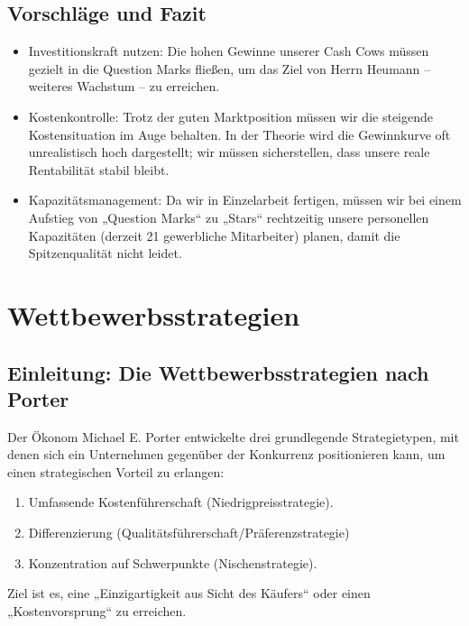 \documentclass[12pt, a4paper]{article}
\begin{document}
\subsection{Vorschläge und Fazit}
\begin{itemize}
\item Investitionskraft nutzen: Die hohen Gewinne unserer Cash Cows müssen gezielt in die Question Marks fließen, 
    um das Ziel von Herrn Heumann – weiteres Wachstum – zu erreichen.
\item Kostenkontrolle: Trotz der guten Marktposition müssen wir die steigende Kostensituation im 
    Auge behalten. In der Theorie wird die Gewinnkurve oft unrealistisch hoch dargestellt; wir müssen sicherstellen, dass unsere reale Rentabilität stabil bleibt.
\item Kapazitätsmanagement: Da wir in Einzelarbeit fertigen, müssen wir bei einem Aufstieg von 
    „Question Marks“ zu „Stars“ rechtzeitig unsere personellen Kapazitäten (derzeit 21 gewerbliche Mitarbeiter) planen, damit die Spitzenqualität nicht leidet.
\end{itemize}
\newpage

\section{Wettbewerbsstrategien}
\subsection{Einleitung: Die Wettbewerbsstrategien nach Porter}
Der Ökonom Michael E. Porter entwickelte drei grundlegende Strategietypen, 
mit denen sich ein Unternehmen gegenüber der Konkurrenz positionieren kann, 
um einen strategischen Vorteil zu erlangen:
\begin{enumerate}
    \item  Umfassende Kostenführerschaft (Niedrigpreisstrategie).
    \item  Differenzierung (Qualitätsführerschaft/Präferenzstrategie)
    \item  Konzentration auf Schwerpunkte (Nischenstrategie).
\end{enumerate}
Ziel ist es, eine „Einzigartigkeit aus Sicht des Käufers“ oder einen „Kostenvorsprung“ zu erreichen.
\end{document}
